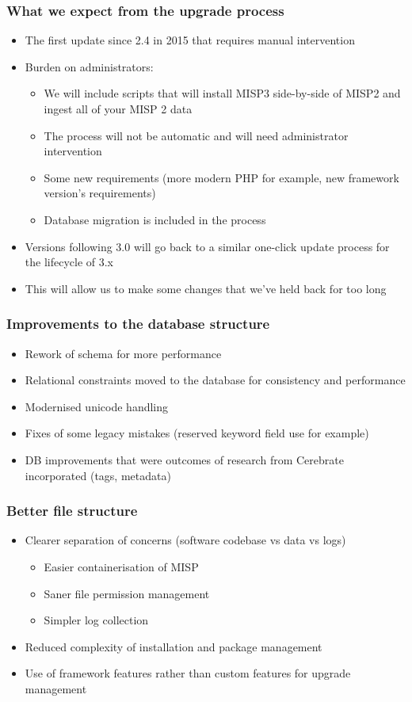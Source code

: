 \begin{frame}
  \frametitle{What we expect from the upgrade process}
  \begin{itemize}
     \item The first update since 2.4 in 2015 that requires manual intervention
     \item Burden on administrators:
     \begin{itemize}
         \item We will include scripts that will install MISP3 side-by-side of MISP2 and ingest all of your MISP 2 data
         \item The process will not be automatic and will need administrator intervention
         \item Some new requirements (more modern PHP for example, new framework version's requirements)
         \item Database migration is included in the process
     \end{itemize}
     \item Versions following 3.0 will go back to a similar one-click update process for the lifecycle of 3.x
     \item This will allow us to make some changes that we've held back for too long
  \end{itemize}
\end{frame}

\begin{frame}
  \frametitle{Improvements to the database structure}
  \begin{itemize}
     \item Rework of schema for more performance
     \item Relational constraints moved to the database for consistency and performance
     \item Modernised unicode handling
     \item Fixes of some legacy mistakes (reserved keyword field use for example)
     \item DB improvements that were outcomes of research from Cerebrate incorporated (tags, metadata)
  \end{itemize}
\end{frame}

\begin{frame}
  \frametitle{Better file structure}
  \begin{itemize}
     \item Clearer separation of concerns (software codebase vs data vs logs)
     \begin{itemize}
         \item Easier containerisation of MISP
         \item Saner file permission management
         \item Simpler log collection
     \end{itemize}
     \item Reduced complexity of installation and package management
     \item Use of framework features rather than custom features for upgrade management
  \end{itemize}
\end{frame}

